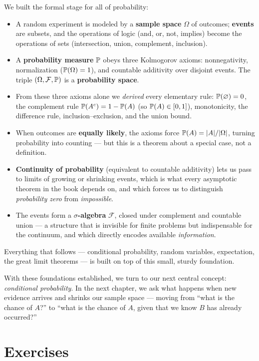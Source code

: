 We built the formal stage for all of probability:
\begin{itemize}
\item A random experiment is modeled by a \textbf{sample space} $\Omega$ of
outcomes; \textbf{events} are subsets, and the operations of logic (and, or, not,
implies) become the operations of sets (intersection, union, complement,
inclusion).
\item A \textbf{probability measure} $\P$ obeys three Kolmogorov axioms:
nonnegativity, normalization ($\P(\Omega)=1$), and countable additivity over
disjoint events. The triple $(\Omega, \mathcal{F}, \P)$ is a \textbf{probability
space}.
\item From these three axioms alone we \emph{derived} every elementary rule:
$\P(\varnothing)=0$, the complement rule $\P(A^c)=1-\P(A)$ (so $\P(A)\in[0,1]$),
monotonicity, the difference rule, inclusion--exclusion, and the union bound.
\item When outcomes are \textbf{equally likely}, the axioms force
$\P(A) = \abs{A}/\abs{\Omega}$, turning probability into counting --- but this is
a theorem about a special case, not a definition.
\item \textbf{Continuity of probability} (equivalent to countable additivity)
lets us pass to limits of growing or shrinking events, which is what every
asymptotic theorem in the book depends on, and which forces us to distinguish
\emph{probability zero} from \emph{impossible}.
\item The events form a \textbf{$\sigma$-algebra} $\mathcal{F}$, closed under
complement and countable union --- a structure that is invisible for finite
problems but indispensable for the continuum, and which directly encodes
available \emph{information}.
\end{itemize}

Everything that follows --- conditional probability, random variables,
expectation, the great limit theorems --- is built on top of this small, sturdy
foundation.

With these foundations established, we turn to our next central concept:
\emph{conditional probability}. In the next chapter, we ask what happens when new
evidence arrives and shrinks our sample space --- moving from ``what is the
chance of $A$?'' to ``what is the chance of $A$, given that we know $B$ has already
occurred?''

\section{Exercises}
\label{ch03:exercises}

